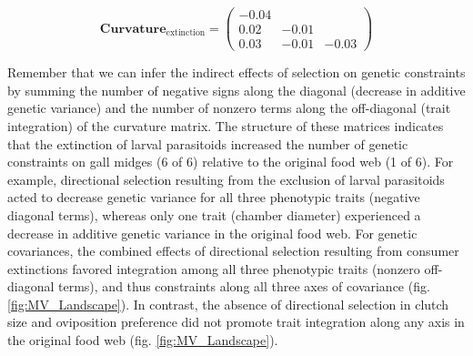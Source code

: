 \documentclass[11pt,]{article}
\begin{document}
\[\textbf{Curvature}_{\text{extinction}} = \begin{pmatrix} 
-0.04 &  &  \\  
0.02 & -0.01 &  \\  
0.03 & -0.01 & -0.03 \end{pmatrix}\]

Remember that we can infer the indirect effects of selection on genetic
constraints by summing the number of negative signs along the diagonal
(decrease in additive genetic variance) and the number of nonzero terms
along the off-diagonal (trait integration) of the curvature matrix. The
structure of these matrices indicates that the extinction of larval
parasitoids increased the number of genetic constraints on gall midges
(6 of 6) relative to the original food web (1 of 6). For example,
directional selection resulting from the exclusion of larval parasitoids
acted to decrease genetic variance for all three phenotypic traits
(negative diagonal terms), whereas only one trait (chamber diameter)
experienced a decrease in additive genetic variance in the original food
web. For genetic covariances, the combined effects of directional
selection resulting from consumer extinctions favored integration among
all three phenotypic traits (nonzero off-diagonal terms), and thus
constraints along all three axes of covariance (fig.
\ref{fig:MV_Landscape}). In contrast, the absence of directional
selection in clutch size and oviposition preference did not promote
trait integration along any axis in the original food web (fig.
\ref{fig:MV_Landscape}).
\end{document}
